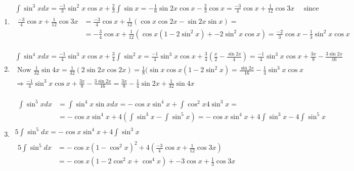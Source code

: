 \documentclass[twoside]{amsart}
\theoremstyle{plain}
\theoremstyle{definition}
\newcommand{\exercisehead}[1]
  {\smallskip
   \noindent{\small\bf Exercise #1.}}
\begin{document}
\exercisehead{10} 
\begin{enumerate}
  \item \[
\begin{gathered}
  \int \sin^3{x} dx = \frac{-1}{3} \sin^2{x} \cos{x} + \frac{2}{3} \int \sin{x} = -\frac{1}{6} \sin{2x} \cos{x} - \frac{2}{3} \cos{x} = \frac{-3}{4} \cos{x} + \frac{1}{12} \cos{3x} \quad \text{ since } \\
  \begin{aligned}
  \frac{-3}{4} \cos{x} + \frac{1}{12} \cos{3x} & = \frac{-3}{4} \cos{x} + \frac{1}{12} (\cos{x} \cos{2x} - \sin{2x} \sin{x} ) = \\
  & =  -\frac{3}{4} \cos{x} + \frac{1}{12} (\cos{x} (1- 2 \sin^2{x}) + - 2 \sin^2{x} \cos{x} )  = \boxed{ \frac{-2}{3} \cos{x} - \frac{1}{3} \sin^2{x} \cos{x} }
  \end{aligned}
\end{gathered}
\]
  \item 
\[
\begin{gathered}
  \int \sin^4{x} dx = \frac{-1}{4} \sin^3{x} \cos{x} + \frac{3}{4} \int \sin^2{x} = \frac{-1}{4} \sin^3{x} \cos{x} + \frac{3}{4} ( \frac{x}{2} - \frac{ \sin{2x}}{4} ) = \frac{-1}{4} \sin^3{x} \cos{x} + \frac{3x}{8} - \frac{3\sin{2x}}{16} \\
  \text{ Now } \frac{1}{32} \sin{4x} = \frac{1}{32} (2\sin{2x} \cos{2x} ) = \frac{1}{8} (\sin{x} \cos{x} (1- 2 \sin^2{x}) = \frac{ \sin{2x}}{16} - \frac{1}{4} \sin^3{x} \cos{x} \\
  \Longrightarrow \frac{-1}{4} \sin^3{x} \cos{x} + \frac{3x}{8} - \frac{3\sin{2x}}{16} = \frac{3x}{8} - \frac{1}{4} \sin{2x} + \frac{1}{32} \sin{4x} 
\end{gathered}
\]
  \item \[
\begin{gathered}
  \begin{aligned}
    \int \sin^5{x} dx & = \int \sin^4{x} \sin{x} dx = -\cos{x} \sin^4{x} + \int \cos^2{x} 4 \sin^3{x} = \\
    & = -\cos{x} \sin^4{x} + 4 (\int \sin^3{x} - \int \sin^5{x} ) = -\cos{x} \sin^4{x} + 4 \int \sin^3{x} - 4 \int \sin^5{x}
\end{aligned} \\
  5 \int \sin^5 dx = -\cos{x} \sin^4{x} + 4 \int \sin^3{x} \\
  \begin{aligned}
    5 \int \sin^5 dx & = - \cos{x} (1- \cos^2{x})^2 + 4 ( \frac{-3}{4} \cos{x} + \frac{1}{12} \cos{3x} ) \\
    & = - \cos{x} (1- 2 \cos^2{x} + \cos^4{x} ) + -3 \cos{x} + \frac{1}{3} \cos{3x} \\

\end{aligned}
\end{gathered}\]
\end{enumerate}
\end{document}
